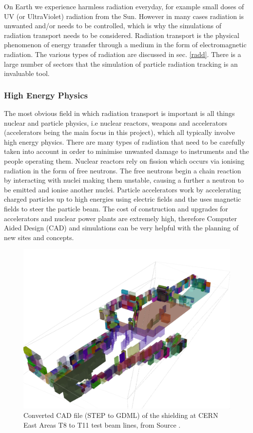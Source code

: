 \documentclass[12pt,a4paper]{article}
\begin{document}
\noindent On Earth we experience harmless radiation everyday, for example small doses of UV (or UltraViolet) radiation from the Sun. However in many cases radiation is unwanted and/or needs to be controlled, which is why the simulations of radiation transport needs to be considered. Radiation transport is the physical phenomenon of energy transfer through a medium in the form of electromagnetic radiation. The various types of radiation are discussed in sec. \ref{radd}. There is a large number of sectors that the simulation of particle radiation tracking is an invaluable tool.

\subsubsection{High Energy Physics}
\noindent The most obvious field in which radiation transport is important is all things nuclear and particle physics, i.e nuclear reactors, weapons and accelerators (accelerators being the main focus in this project), which all typically involve high energy physics. There are many types of radiation that need to be carefully taken into account in order to minimise unwanted damage to instruments and the people operating them. Nuclear reactors rely on fission which occurs via ionising radiation in the form of free neutrons. The free neutrons begin a chain reaction by interacting with nuclei making them unstable, causing a further a neutron to be emitted and ionise another nuclei. Particle accelerators work by accelerating charged particles up to high energies using electric fields and the uses magnetic fields to steer the particle beam. The cost of construction and upgrades for accelerators and nuclear power plants are extremely high, therefore Computer Aided Design (CAD) and simulations can be very helpful with the planning of new sites and concepts. 

\begin{figure}[h!]
\centering
\includegraphics[scale=0.13]{Images//introduction//CernEast.jpg}
\caption[width=\columnwidth]{Converted CAD file (STEP to GDML) of the shielding at CERN East Areas T8 to T11 test beam lines, from Source \cite{pyg4om}.}
\label{cerncad}
\end{figure}
\end{document}
